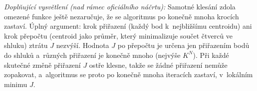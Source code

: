 \medskip
\noindent\textit{Doplňující vysvětlení (nad rámec oficiálního náčrtu):} Samotné klesání zdola omezené funkce ještě nezaručuje, že se algoritmus po konečně mnoha krocích zastaví. Úplný argument: krok přiřazení (každý bod k~nejbližšímu centroidu) ani krok přepočtu (centroid jako průměr, který minimalizuje součet čtverců ve shluku) ztrátu $J$ nezvýší. Hodnota $J$ po přepočtu je určena jen přiřazením bodů do shluků a~různých přiřazení je konečně mnoho (nejvýše $K^N$). Při každé skutečné změně přiřazení $J$ ostře klesne, takže se žádné přiřazení nemůže zopakovat, a~algoritmus se proto po konečně mnoha iteracích zastaví, v~lokálním minimu $J$.
